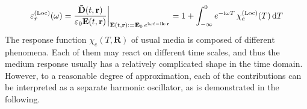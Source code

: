 {\begin{equation}  \varepsilon_r^{\rm(Loc)}(\omega) =   \frac{\mathbf{\tilde{D}}(t,{\mathbf{r}})}{\varepsilon_0 \mathbf{E}(t,{\mathbf{r}})} \biggr|_{\mathbf{E}(t, {\mathbf{r}}) := \mathbf{E}_0 \, e^{{\mathrm i}\omega t - {\mathrm i}{\mathbf{k}}\cdot{\mathbf{r}}}} = 1 + \int_{-\infty}^{0} e^{-{\mathrm i}\omega T} \,\chi_e^{\rm(Loc)}(T) \,\mbox{d}T \label{eq_eps_loc}\end{equation}
The response function $\chi_e(T, \mathbf{R})$ of usual media is composed of different phenomena.
Each of them may react on different time scales, and thus the medium response usually has a relatively complicated shape in the time domain. 
However, to a reasonable degree of approximation, each of the contributions can be interpreted as a separate harmonic oscillator, as is demonstrated in the following.
}
